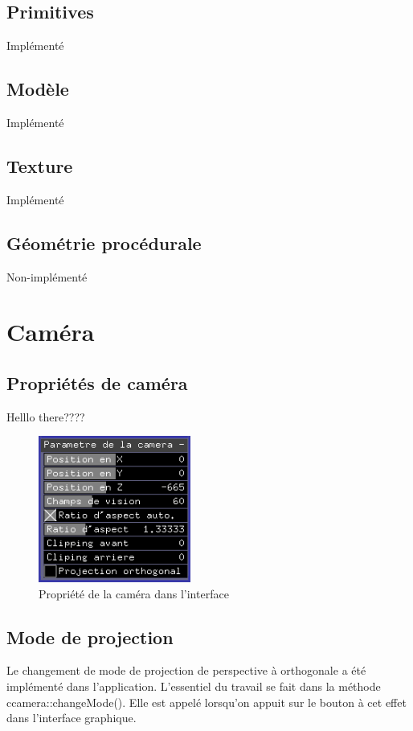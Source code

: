 \subsection{Primitives}
Implémenté

\subsection{Modèle}
Implémenté

\subsection{Texture}
Implémenté

\subsection{Géométrie procédurale}
Non-implémenté

\pagebreak
\section{Caméra}
\subsection{Propriétés de caméra}
Helllo there????

\begin{figure}[h]
	\centering
	\includegraphics[width=5cm]{fig/proprieteCamera.png}
	\caption{Propriété de la caméra dans l'interface}
	\label{fig:test}
\end{figure}

\subsection{Mode de projection}
Le changement de mode de projection de perspective à orthogonale a été implémenté dans l'application. L'essentiel du travail se fait dans la méthode ccamera::changeMode(). Elle est appelé lorsqu'on appuit sur le bouton à cet effet dans l'interface graphique.

